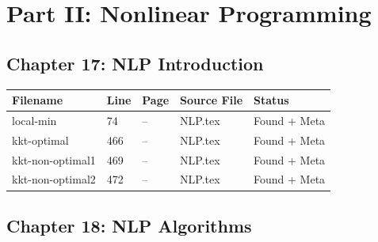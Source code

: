 \documentclass[11pt]{article}
\begin{document}
\section{Part II: Nonlinear Programming}


\subsection{Chapter 17: NLP Introduction}



\begin{longtable}{|p{3.5cm}|p{1.5cm}|p{1cm}|p{4cm}|p{2cm}|}
\hline
\textbf{Filename} & \textbf{Line} & \textbf{Page} & \textbf{Source File} & \textbf{Status} \\
\hline
\endhead

local-min & 74 & -- & NLP.tex & \textcolor{found}{Found + Meta} \\
\hline

kkt-optimal & 466 & -- & NLP.tex & \textcolor{found}{Found + Meta} \\
\hline

kkt-non-optimal1 & 469 & -- & NLP.tex & \textcolor{found}{Found + Meta} \\
\hline

kkt-non-optimal2 & 472 & -- & NLP.tex & \textcolor{found}{Found + Meta} \\
\hline

\end{longtable}


\subsection{Chapter 18: NLP Algorithms}
\end{document}
